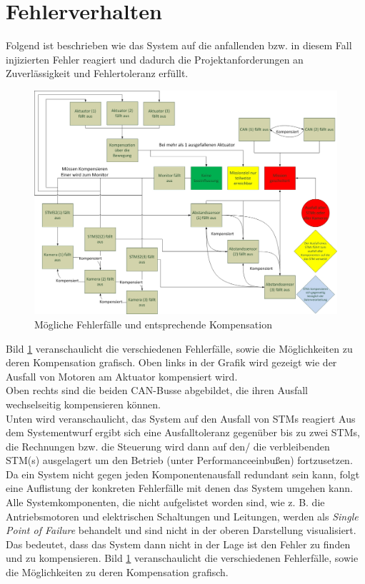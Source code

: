 \section{Fehlerverhalten}
\label{Fehlervehalten}
Folgend ist beschrieben wie das System auf die anfallenden bzw. in diesem Fall injizierten Fehler reagiert und dadurch die Projektanforderungen an Zuverlässigkeit und Fehlertoleranz erfüllt.
\begin{figure}[H]
\centering
\includegraphics[width=\linewidth]{Bilder/FaTNet_fehlerverhalten}
\caption{Mögliche Fehlerfälle und entsprechende Kompensation}
\label{fig:fehlerverhalten}
\end{figure}

Bild \ref{fig:fehlerverhalten} veranschaulicht die verschiedenen Fehlerfälle, sowie die Möglichkeiten zu deren Kompensation grafisch.
Oben links in der Grafik wird gezeigt wie der Ausfall von Motoren am  Aktuator kompensiert wird.\\
Oben rechts sind die beiden CAN-Busse abgebildet, die ihren Ausfall wechselseitig kompensieren können.\\
Unten wird veranschaulicht, das System auf den Ausfall von STMs reagiert
Aus dem Systementwurf ergibt sich eine Ausfalltoleranz gegenüber bis zu zwei STMs, die Rechnungen bzw. die Steuerung wird dann  auf den/ die verbleibenden STM(s) ausgelagert um den Betrieb (unter Performanceeinbußen) fortzusetzen.\\
Da ein System nicht gegen jeden Komponentenausfall redundant sein kann, folgt eine Auflistung der konkreten Fehlerfälle mit denen das System umgehen kann. Alle Systemkomponenten, die nicht aufgelistet worden sind, wie z. B. die Antriebsmotoren und elektrischen Schaltungen und Leitungen, werden als \textit{Single Point of Failure} behandelt und sind nicht in der oberen Darstellung visualisiert. Das bedeutet, dass das System dann nicht in der Lage ist den Fehler zu finden und zu kompensieren.
Bild \ref{fig:fehlerverhalten} veranschaulicht die verschiedenen Fehlerfälle, sowie die Möglichkeiten zu deren Kompensation grafisch.


